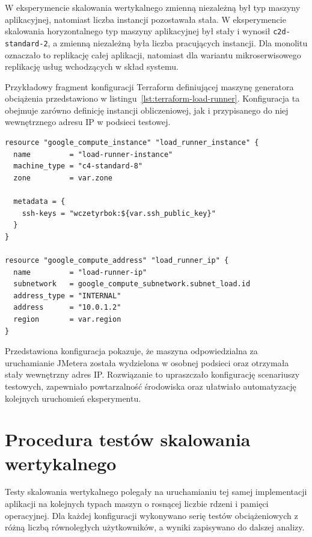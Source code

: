 W eksperymencie skalowania wertykalnego zmienną niezależną był typ maszyny aplikacyjnej, natomiast liczba instancji pozostawała stała. W eksperymencie skalowania horyzontalnego typ maszyny aplikacyjnej był stały i wynosił \texttt{c2d-standard-2}, a zmienną niezależną była liczba pracujących instancji. Dla monolitu oznaczało to replikację całej aplikacji, natomiast dla wariantu mikroserwisowego replikację usług wchodzących w skład systemu.

Przykładowy fragment konfiguracji Terraform definiującej maszynę generatora obciążenia przedstawiono w listingu~\ref{lst:terraform-load-runner}. Konfiguracja ta obejmuje zarówno definicję instancji obliczeniowej, jak i przypisanego do niej wewnętrznego adresu IP w podsieci testowej.

\begin{listing}[H]
    \begin{verbatim}
resource "google_compute_instance" "load_runner_instance" {
  name         = "load-runner-instance"
  machine_type = "c4-standard-8"
  zone         = var.zone

  metadata = {
    ssh-keys = "wczetyrbok:${var.ssh_public_key}"
  }
}

resource "google_compute_address" "load_runner_ip" {
  name         = "load-runner-ip"
  subnetwork   = google_compute_subnetwork.subnet_load.id
  address_type = "INTERNAL"
  address      = "10.0.1.2"
  region       = var.region
}
    \end{verbatim}
    \caption{Przykładowa konfiguracja Terraform dla maszyny generatora obciążenia}
    \label{lst:terraform-load-runner}
\end{listing}

Przedstawiona konfiguracja pokazuje, że maszyna odpowiedzialna za uruchamianie JMetera została wydzielona w osobnej podsieci oraz otrzymała stały wewnętrzny adres IP. Rozwiązanie to upraszczało konfigurację scenariuszy testowych, zapewniało powtarzalność środowiska oraz ułatwiało automatyzację kolejnych uruchomień eksperymentu.

\section{Procedura testów skalowania wertykalnego}

Testy skalowania wertykalnego polegały na uruchamianiu tej samej implementacji aplikacji na kolejnych typach maszyn o rosnącej liczbie rdzeni i pamięci operacyjnej. Dla każdej konfiguracji wykonywano serię testów obciążeniowych z różną liczbą równoległych użytkowników, a wyniki zapisywano do dalszej analizy.


